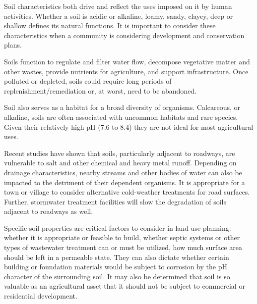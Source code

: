Soil characteristics both drive and reflect the uses imposed on it by human activities. Whether a soil is acidic or alkaline, loamy, sandy, clayey, deep or shallow defines its natural functions. It is important to consider these characteristics when a community is considering development and conservation plans. 

Soils function to regulate and filter water flow, decompose vegetative matter and other wastes, provide nutrients for agriculture, and support infrastructure. Once polluted or depleted, soils could require long periods of replenishment/remediation or, at worst, need to be abandoned.

Soil also serves as a habitat for a broad diversity of organisms. Calcareous, or alkaline, soils are often associated with uncommon habitats and rare species. Given their relatively high pH (7.6 to 8.4) they are not ideal for most agricultural uses. 

Recent studies have shown that soils, particularly adjacent to roadways, are vulnerable to salt and other chemical and heavy metal runoff. Depending on drainage characteristics, nearby streams and other bodies of water can also be impacted to the detriment of their dependent organisms. It is appropriate for a town or village to consider alternative cold-weather treatments for road surfaces. Further, stormwater treatment facilities will slow the degradation of soils adjacent to roadways as well. 

Specific soil properties are critical factors to consider in land-use planning: whether it is appropriate or feasible to build, whether septic systems or other types of wastewater treatment can or must be utilized, how much surface area should be left in a permeable state. They can also dictate whether certain building or foundation materials would be subject to corrosion by the pH character of the surrounding soil. It may also be determined that soil is so valuable as an agricultural asset that it should not be subject to commercial or residential development.
